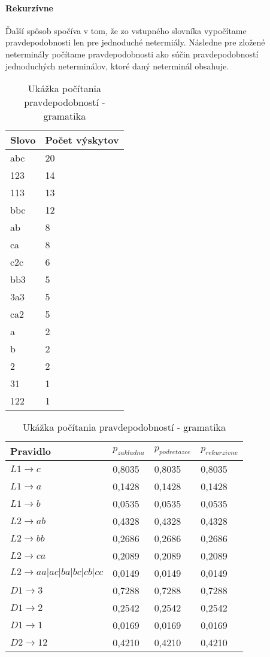 \paragraph{Rekurzívne}
Ďalší spôsob spočíva v tom, že zo vstupného slovníka vypočítame pravdepodobnosti len pre jednoduché netermiály. Následne pre zložené neterminály počítame pravdepodobnosti ako súčin pravdepodobností jednoduchých neterminálov, ktoré daný neterminál obsahuje.

\begin{table}[]
\centering
\caption{Ukážka počítania pravdepodobností - gramatika}
\label{gramatikaPP}
\begin{tabular}{ll}
Slovo & Počet výskytov \\ \hline
abc & 20 \\ 
123 & 14 \\ 
113 & 13 \\ 
bbc & 12 \\ 
ab & 8 \\ 
ca & 8 \\ 
c2c & 6 \\ 
bb3 & 5 \\ 
3a3 & 5 \\ 
ca2 & 5 \\ 
a & 2 \\ 
b & 2 \\ 
2 & 2 \\ 
31 & 1 \\ 
122 & 1
\end{tabular}
\quad
\begin{tabular}{l|lll}
Pravidlo & \(p_{zakladna}\) & \(p_{podretazce}\) & \(p_{rekurzivne}\) \\ \hline
\(L1 \to c\) & 0,8035 & 0,8035 & 0,8035 \\
\(L1 \to a\) & 0,1428 & 0,1428 & 0,1428 \\
\(L1 \to b\) & 0,0535 & 0,0535 & 0,0535 \\
\(L2 \to ab\) & 0,4328 & 0,4328 & 0,4328 \\
\(L2 \to bb\) & 0,2686 & 0,2686 & 0,2686 \\
\(L2 \to ca\) & 0,2089 & 0,2089 & 0,2089 \\
\(L2 \to aa|ac|ba|bc|cb|cc\) & 0,0149 & 0,0149 & 0,0149 \\
\(D1 \to 3\) & 0,7288 & 0,7288 & 0,7288 \\
\(D1 \to 2\) & 0,2542 & 0,2542 & 0,2542 \\
\(D1 \to 1\) & 0,0169 & 0,0169 & 0,0169 \\
\(D2 \to 12\) & 0,4210 & 0,4210 & 0,4210 \\

\end{tabular}
\end{table}
